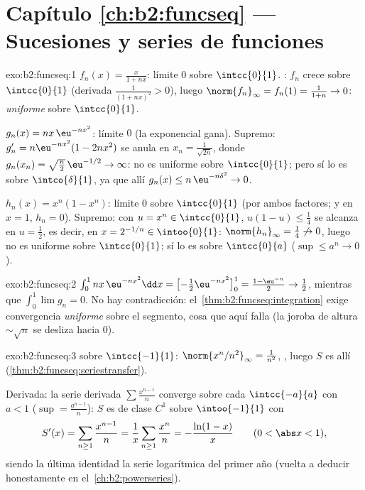 \section*{Capítulo \ref{ch:b2:funcseq} --- Sucesiones y series de
funciones}

\begin{solution}{exo:b2:funcseq:1}
$f_n(x) = \frac{x}{1 + nx}$: límite  $0$ sobre
$\intcc{0}{1}$. : $f_n$ crece sobre $\intcc{0}{1}$
(derivada $\frac{1}{(1+nx)^2} > 0$), luego $\norm{f_n}_\infty =
f_n(1) = \frac{1}{1+n} \to 0$: \emph{uniforme} sobre $\intcc{0}{1}$.

$g_n(x) = nx\,\eu^{-nx^2}$: límite  $0$ (la exponencial
gana). Supremo: $g_n' = n\eu^{-nx^2}(1 - 2nx^2)$ se anula en $x_n =
\frac{1}{\sqrt{2n}}$, donde $g_n(x_n) = \sqrt{\frac n2}\,\eu^{-1/2}
\to \infty$: no es uniforme sobre $\intcc{0}{1}$; pero sí lo es
sobre $\intco{\delta}{1}$, ya que allí $g_n(x) \leq
n\,\eu^{-n\delta^2} \to 0$.

$h_n(x) = x^n(1 - x^n)$: límite  $0$ sobre $\intcc{0}{1}$
(por ambos factores; y en $x = 1$, $h_n = 0$). Supremo: con $u = x^n
\in \intcc{0}{1}$, $u(1-u) \leq \frac14$ se alcanza en $u =
\frac12$, es decir, en $x = 2^{-1/n} \in \intoo{0}{1}$:
$\norm{h_n}_\infty = \frac14 \not\to 0$, luego no es uniforme sobre
$\intcc{0}{1}$; sí lo es sobre $\intcc{0}{a}$ ($\sup \leq a^n \to
0$).
\end{solution}

\begin{solution}{exo:b2:funcseq:2}
$\int_0^1 nx\,\eu^{-nx^2}\dd x = \bigl[-\tfrac12
\eu^{-nx^2}\bigr]_0^1 = \frac{1 - \eu^{-n}}{2} \to \frac12$,
mientras que $\int_0^1 \lim g_n = 0$. No hay contradicción: el~\cref{thm:b2:funcseq:integration} exige convergencia
\emph{uniforme} sobre el segmento, cosa que aquí falla (la joroba de
altura $\sim\sqrt n$ se desliza hacia $0$).
\end{solution}

\begin{solution}{exo:b2:funcseq:3}
 sobre $\intcc{-1}{1}$: $\norm{x^n/n^2}_\infty =
\frac{1}{n^2}$, , luego $S$ es allí 
(\cref{thm:b2:funcseq:seriestransfer}).

Derivada: la serie derivada $\sum \frac{x^{n-1}}{n}$ converge
 sobre cada $\intcc{-a}{a}$ con $a < 1$ ($\sup =
\frac{a^{n-1}}{n}$): $S$ es de clase $C^1$ sobre $\intoo{-1}{1}$
con
\[
S'(x) = \sum_{n\geq1} \frac{x^{n-1}}{n} = \frac1x \sum_{n\geq1}
\frac{x^n}{n} = -\frac{\ln(1 - x)}{x}
\qquad (0 < \abs x < 1),
\]
siendo la última identidad la serie logarítmica del primer año
(vuelta a deducir honestamente en el~\cref{ch:b2:powerseries}).
\end{solution}

